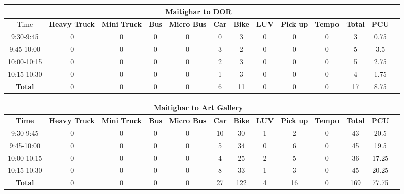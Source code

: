 \begin{landscape}
\centering
\begin{table}[h!]
\centering
\begin{tabular}{|c|c|c|c|c|c|c|c|c|c|c|c|c|}
    \hline
    \multicolumn{12}{|c|}{\textbf{Maitighar to DOR}} \\
    \hline
        Time & \textbf{Heavy Truck} & \textbf{Mini Truck} & \textbf{Bus} & \textbf{Micro Bus} & \textbf{Car} & \textbf{Bike} & \textbf{LUV} & \textbf{Pick up} & \textbf{Tempo} & \textbf{\textbf{Total}} & \textbf{PCU} \\
    \hline
9:30-9:45	&0	&0	&0	&0	&0	&3	&0	&0	&0	&3	&0.75 \\ \hline
9:45-10:00	&0	&0	&0	&0	&3	&2	&0	&0	&0	&5	&3.5 \\ \hline
10:00-10:15	&0	&0	&0	&0	&2	&3	&0	&0	&0	&5	&2.75 \\ \hline
10:15-10:30	&0	&0	&0	&0	&1	&3	&0	&0	&0	&4	&1.75 \\ \hline
\textbf{Total}	&0	&0	&0	&0	&6	&11	&0	&0	&0	&17	&8.75 \\ \hline
\end{tabular}

\vspace{0.5cm}

\begin{tabular}{|c|c|c|c|c|c|c|c|c|c|c|c|c|}
    \hline
    \multicolumn{12}{|c|}{\textbf{Maitighar to Art Gallery}} \\
    \hline
    \textbf{Time} & \textbf{Heavy Truck} & \textbf{Mini Truck} & \textbf{Bus} & \textbf{Micro Bus} & \textbf{Car} & \textbf{Bike} & \textbf{LUV} & \textbf{Pick up} & \textbf{Tempo} & \textbf{\textbf{Total}} & \textbf{PCU} \\
    \hline
9:30-9:45	&0	&0	&0	&0	&10	&30	&1	&2	&0	&43	&20.5 \\ \hline
9:45-10:00	&0	&0	&0	&0	&5	&34	&0	&6	&0	&45	&19.5 \\ \hline
10:00-10:15	&0	&0	&0	&0	&4	&25	&2	&5	&0	&36	&17.25 \\ \hline
10:15-10:30	&0	&0	&0	&0	&8	&33	&1	&3	&0	&45	&20.25 \\ \hline
\textbf{Total}	&0	&0	&0	&0	&27	&122	&4	&16	&0	&169	&77.75 \\ \hline

\end{tabular}
\end{table}
\end{landscape}


